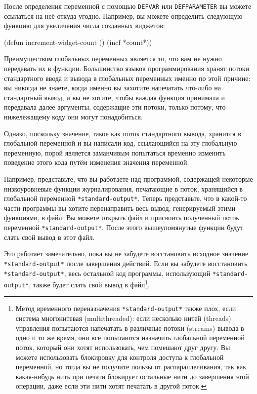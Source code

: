 После определения переменной с помощью \lstinline{DEFVAR} или \lstinline{DEFPARAMETER} вы
можете ссылаться на неё откуда угодно. Например, вы можете определить следующую функцию
для увеличения числа созданных виджетов:

\begin{myverb}
(defun increment-widget-count () (incf *count*))
\end{myverb}

Преимуществом глобальных переменных является то, что вам не нужно передавать их в
функции. Большинство языков программирования хранят потоки стандартного ввода и вывода в
глобальных переменных именно по этой причине: вы никогда не знаете, когда именно вы
захотите напечатать что-либо на стандартный вывод, и вы не хотите, чтобы каждая функция
принимала и передавала далее аргументы, содержащие эти потоки, только потому, что
нижележащему коду они могут понадобиться.

Однако, поскольку значение, такое как поток стандартного вывода, хранится в глобальной
переменной и вы написали код, ссылающийся на эту глобальную переменную, порой является
заманчивым попытаться временно изменить поведение этого кода путём изменения значения
переменной.

Например, представьте, что вы работаете над программой, содержащей некоторые
низкоуровневые функции журналирования, печатающие в поток, хранящийся в глобальной
переменной \lstinline{*standard-output*}. Теперь представьте, что в какой-то части программы вы
хотите перенаправить весь вывод, генерируемый этими функциями, в файл. Вы можете открыть
файл и присвоить полученный поток переменной \lstinline{*standard-output*}. После этого
вышеупомянутые функции будут слать свой вывод в этот файл.

Это работает замечательно, пока вы не забудете восстановить исходное значение
\lstinline{*standard-output*} после завершения действий. Если вы забудете восстановить
\lstinline{*standard-output*}, весь остальной код программы, использующий
\lstinline{*standard-output*}, также будет слать свой вывод в файл\footnote{Метод временного
  переназначения \lstinline{*standard-output*} также плох, если система многонитевая
  (multithreaded): если несколько нитей (threads) управления попытаются напечатать в
  различные потоки (streams) вывода в одно и то же время, они все попытаются назначить
  глобальной переменной поток, который они хотят использовать, чем помешают друг другу. Вы
  можете использовать блокировку для контроля доступа к глобальной переменной, но тогда вы
  не получите пользы от распараллеливания, так как какая-нибудь нить при печати блокирует
  остальные нити до завершения этой операции, даже если эти нити хотят печатать в другой
  поток.}.


